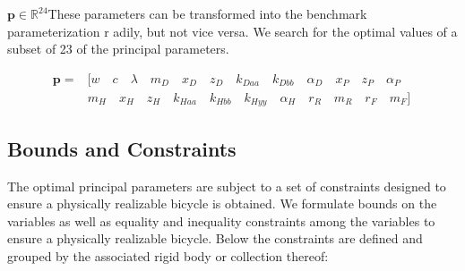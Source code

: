 \documentclass{bmd2019a}
\begin{document}
$\mathbf{p}\in\mathbb{R}^{24}$These parameters can be transformed into the benchmark parameterization
r adily, but not vice versa.
We search for the optimal values of a subset of 23 of the principal parameters.

\begin{align}
  \mathbf{p} = &
    [w \quad
     c \quad
     \lambda \quad
     m_D \quad
     x_D \quad
     z_D \quad
     k_{Daa} \quad
     k_{Dbb} \quad
     \alpha_D \quad
     x_P \quad
     z_P \quad
     \alpha_P \quad \\
 &    m_H \quad
     x_H \quad
     z_H \quad
     k_{Haa} \quad
     k_{Hbb} \quad
     k_{Hyy} \quad
     \alpha_H \quad
     r_R \quad
     m_R \quad
     r_F \quad
     m_F]
\end{align}

\subsection*{Bounds and Constraints}
%
The optimal principal parameters are subject to a set of constraints designed
to ensure a physically realizable bicycle is obtained.
We formulate bounds on the variables as well as equality and inequality
constraints among the variables to ensure a physically realizable bicycle.
Below the constraints are defined and grouped by the associated rigid body or
collection thereof:
%
\end{document}

